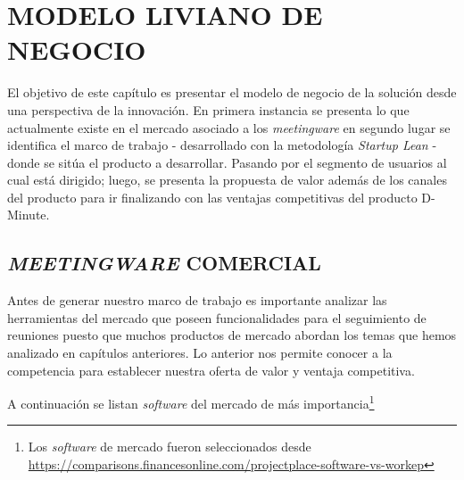 \section{MODELO LIVIANO DE NEGOCIO}

El objetivo de este capítulo es presentar el modelo de negocio de la solución desde una perspectiva de la innovación. En primera instancia se presenta lo que actualmente existe en el mercado asociado a los \textit{meetingware} en segundo lugar se identifica el marco de trabajo - desarrollado con la metodología \textit{Startup Lean} - donde se sitúa el producto a desarrollar. Pasando por el segmento de usuarios al cual está dirigido; luego, se presenta la propuesta de valor además de los canales del producto para ir finalizando con las ventajas competitivas del producto D-Minute.

\subsection{\textit{MEETINGWARE} COMERCIAL}

Antes de generar nuestro marco de trabajo es importante analizar las herramientas del mercado que poseen funcionalidades para el seguimiento de reuniones puesto que muchos productos de mercado abordan los temas que hemos analizado en capítulos anteriores. Lo anterior nos permite conocer a la competencia para establecer nuestra oferta de valor y ventaja competitiva.

A continuación se listan \textit{software} del mercado de más importancia\footnote{Los \textit{software} de mercado fueron seleccionados desde \url{https://comparisons.financesonline.com/projectplace-software-vs-workep}}


